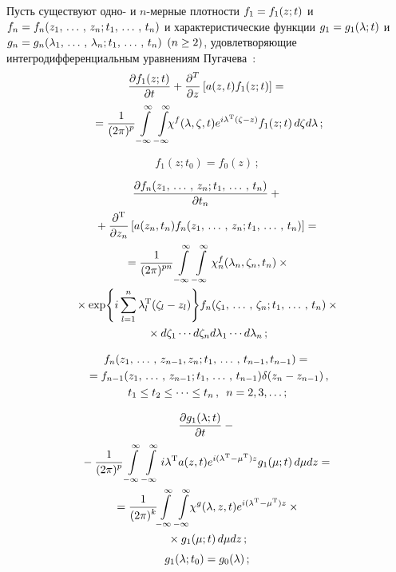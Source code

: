 \begin{multicols}{2}
Пусть существуют одно- и $n$-мер\-ные плот\-но\-сти $f_1\hm=f_1(z;t)$ и
$f_n\hm= f_n(z_1\tr z_n; t_1 \tr t_n)$ и характеристические функции
$g_1\hm=g_1(\la;t)$ и $g_n\hm=g_n(\la_1\tr \la_n; t_1\tr t_n)$ $(n\hm\ge 2)$,
удовлетворяющие интегродифференциальным уравнениям Пугачева~\cite{1-s, 2-s}:
    \begin{multline}
    \fr{\prt f_1(z;t)}{\prt t}+\fr{\prt^T}{\prt z}\lk a(z,t)f_1(z;t)\rk ={}\\
    \!\!{}=
    \fr{1}{(2 \pi)^p}
    \iin\iin \!\!\!\chi^f(\la,\zeta,t) e^{i\la^{\mathrm{T}}(\zeta-z)} f_1(z;t) \,d\zeta d\la\,;\!\!
    \label{e2.5-s}
    \end{multline}

    \vspace*{-12pt}

    \noindent
\begin{equation}
f_1(z;t_0)=f_0(z)\,;\label{e2.6-s}
\end{equation}

\vspace*{-12pt}

    \noindent
\begin{multline*}
 \displaystyle\frac{\displaystyle \partial f_n(z_1,\,\ldots\,,\, z_n;t_1,\,\ldots\,,\, t_n)\mathstrut}{\displaystyle \partial t_n\mathstrut}+{}\\
 {}+
    \displaystyle\frac{\displaystyle \partial^{\mathrm{T}}\mathstrut}{\displaystyle \partial z_n\mathstrut}\left[a(z_n, t_n) f_n (z_1,\,\ldots\,,\, z_n; t_1,\,\ldots\,,\, t_n)\right]={}\\
{}= \displaystyle\frac{\displaystyle 1\mathstrut}{\displaystyle (2\pi)^{pn}\mathstrut} \int\limits_{-\infty}^\infty\int\limits_{-\infty}^\infty \chi_n^f (\lambda_n, \zeta_n, t_n)
\times{}\\
{}\times \exp\!\left\{ i \sum\limits_{l=1}^n \lambda_l^{\mathrm{T}} (\zeta_l-z_l)\right\} \! f_n
    (\zeta_1,\,\ldots\,,\, \zeta_n; t_1,\,\ldots\,,\, t_n)\times{}\\
    {}\times d\zeta_1\cdots d\zeta_n d\lambda_1\cdots d\lambda_n\,;
    \end{multline*}

    \vspace*{-12pt}

    \noindent
    \begin{multline*}
f_n(z_1,\,\ldots\,,\, z_{n-1},z_n;t_1,\,\ldots\,,\, t_{n-1},t_{n-1})={}\\
{}= f_{n-1} (z_1,\,\ldots\,,\, z_{n-1};t_1,\,\ldots\,,\, t_{n-1})\delta (z_n - z_{n-1})\,,\\
t_1\le t_2 \le \cdots \le t_n\,,\enskip n=2,3,\ldots;
        \end{multline*}


\vspace*{-12pt}

    \noindent
\begin{multline}
\fr{\prt g_1 (\la;t)}{\prt t} -{}\\
{}-\fr{1}{(2\pi)^p}
    \iin \iin i\la^{\mathrm{T}} a (z,t) e^{i(\la^{\mathrm{T}} -
    \mu^{\mathrm{T}})z} g_1 (\mu;t) \,d\mu dz={}\\
{}=\fr{1}{(2\pi)^k}\! \iin \iin \! \!\chi^g(\la, z,t) e^{i(\la^{\mathrm{T}} -
\mu^{\mathrm{T}})z} \times{}\\
{}\times g_1 (\mu;t)\, d\mu dz\,;
    \label{e2.9-s}
    \end{multline}
\begin{equation}
g_1(\la;t_0) = g_0(\la)\,;
    \label{e2.10-s}
    \end{equation}


\end{multicols}

